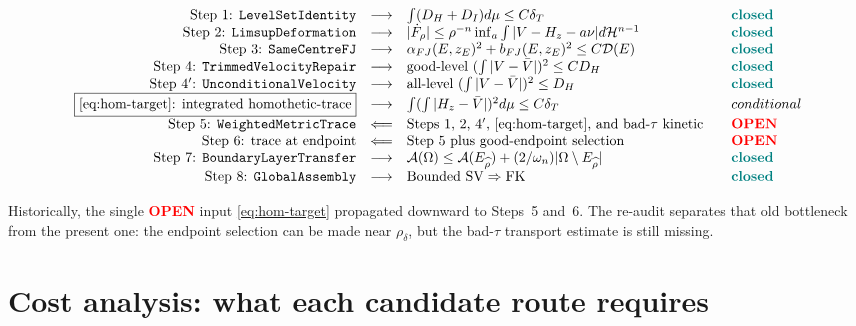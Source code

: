 \documentclass[11pt]{article}
\theoremstyle{definition}
\newcommand{\Om}{\Omega}
\newcommand{\Fr}{\mathcal{A}}
\newcommand{\rdel}{\rho_\delta}
\newcommand{\rhad}{\widehat\rho}
\newcommand{\Hn}{\mathcal H^{n-1}}
\newcommand{\dD}{\mathcal D}
\newcommand{\OPEN}{\textcolor{red}{\bf OPEN}}
\newcommand{\CLOSED}{\textcolor{teal}{\bf closed}}
\begin{document}
\[
\begin{array}{rclcl}
\text{Step 1: \texttt{LevelSetIdentity}}
   & \longrightarrow & \int(D_{H}+D_{I})d\mu\le C\delta_{T} & & \CLOSED \\
\text{Step 2: \texttt{LimsupDeformation}}
   & \longrightarrow & |\dot F_{\rho}|\le \rho^{-n}\inf_{a}\int|V-H_{z}-a\nu|d\Hn & & \CLOSED \\
\text{Step 3: \texttt{SameCentreFJ}}
   & \longrightarrow & \alpha_{FJ}(E,z_{E})^{2}+b_{FJ}(E,z_{E})^{2}\le C\dD(E) & & \CLOSED \\
\text{Step 4: \texttt{TrimmedVelocityRepair}}
   & \longrightarrow & \text{good-level }(\int|V-\bar V|)^{2}\le C D_{H} & & \CLOSED \\
\text{Step 4$'$: \texttt{UnconditionalVelocity}}
   & \longrightarrow & \text{all-level }(\int|V-\bar V|)^{2}\le D_{H} & & \CLOSED \\
\fbox{\eqref{eq:hom-target}: integrated homothetic-trace}
   & \longrightarrow & \int(\int|H_{z}-\bar V|)^{2}d\mu\le C\delta_{T} & & conditional \\
\text{Step 5: \texttt{WeightedMetricTrace}}
   & \Longleftarrow & \text{Steps 1, 2, 4$'$, \eqref{eq:hom-target}, and bad-$\tau$ kinetic} & & \OPEN \\
\text{Step 6: trace at endpoint}
   & \Longleftarrow & \text{Step 5 plus good-endpoint selection} & & \OPEN \\
\text{Step 7: \texttt{BoundaryLayerTransfer}}
   & \longrightarrow & \Fr(\Om)\le \Fr(E_{\rhad})+(2/\omega_{n})|\Om\setminus E_{\rhad}| & & \CLOSED \\
\text{Step 8: \texttt{GlobalAssembly}}
   & \longrightarrow & \text{Bounded SV}\Rightarrow\text{FK} & & \CLOSED \\
\end{array}
\]

\medskip
Historically, the single \OPEN{} input \eqref{eq:hom-target}
propagated downward to Steps~5 and~6.  The re-audit separates that
old bottleneck from the present one: the endpoint selection can be
made near $\rdel$, but the bad-$\tau$ transport estimate is still
missing.

\section{Cost analysis: what each candidate route requires}\label{sec:cost}
\end{document}
